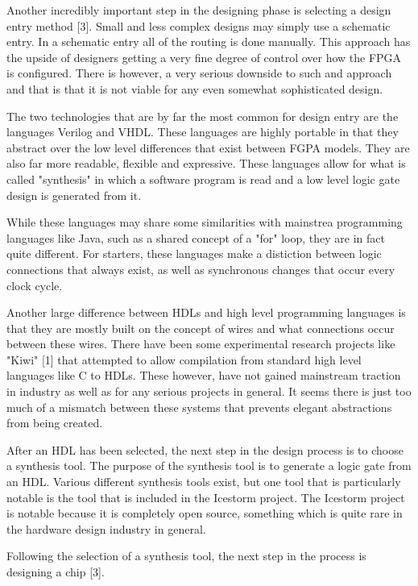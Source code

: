 \documentclass{article}
\begin{document}
    Another incredibly important step in the designing phase is selecting a design
    entry method [3]. Small and less complex designs may simply use a schematic entry.
    In a schematic entry all of the routing is done manually.
    This approach has the upside of designers getting a very fine degree of control over
    how the FPGA is configured.
    There is however, a very serious downside to such and approach and that is that it
    is not viable for any even somewhat sophisticated design.

    The two technologies that are by far the most common for design entry are the languages
    Verilog and VHDL. These languages are highly portable in that they abstract
    over the low level differences that exist between FGPA models.
    They are also far more readable, flexible and expressive. These languages
    allow for what is called "synthesis" in which a software program is read
    and a low level logic gate design is generated from it.

    While these languages may share some similarities with mainstrea programming languages
    like Java, such as a shared concept of a "for" loop, they are in fact quite different.
    For starters, these languages make a distiction between logic connections that
    always exist, as well as synchronous changes that occur every clock cycle.

    Another large difference between HDLs and high level programming languages is that
    they are mostly built on the concept of wires and what connections occur between these
    wires. There have been some experimental research projects like "Kiwi" [1] that
    attempted to allow compilation from standard high level languages like C to HDLs.
    These however, have not gained mainstream traction in industry as well as for any serious
    projects in general. It seems there is just too much of a mismatch between
    these systems that prevents elegant abstractions from being created.

    After an HDL has been selected, the next step in the design process is to choose a
    synthesis tool. The purpose of the synthesis tool is to generate a logic gate
    from an HDL. Various different synthesis tools exist, but one tool that
    is particularly notable is the tool that is included in the Icestorm project.
    The Icestorm project is notable because it is completely open source, something
    which is quite rare in the hardware design industry in general.

    Following the selection of a synthesis tool, the next step in the process
    is designing a chip [3].
\end{document}
